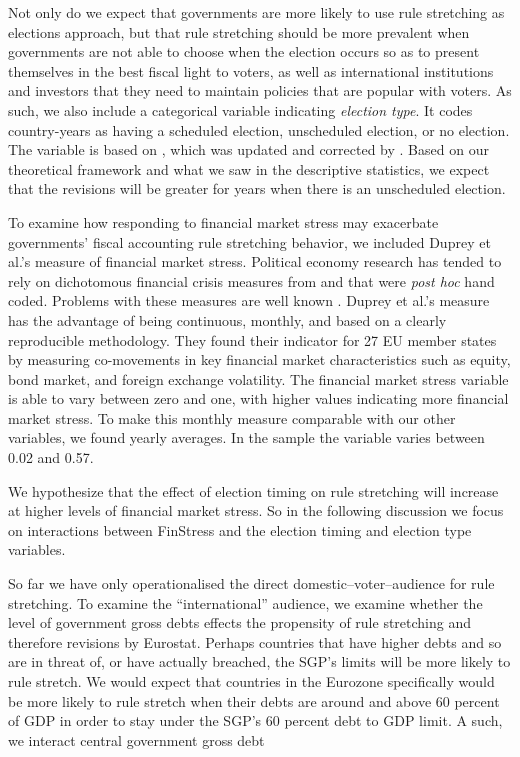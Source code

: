 \documentclass[]{article}
\begin{document}
Not only do we expect that governments are more likely to use rule stretching as elections approach, but that rule stretching should be more prevalent when governments are not able to choose when the election occurs so as to present themselves in the best fiscal light to voters, as well as international institutions and investors that they need to maintain policies that are popular with voters. As such, we also include a categorical variable indicating \emph{election type}. It codes country-years as having a scheduled election, unscheduled election, or no election. The variable is based on \cite{Brender2008}, which was updated and corrected by \cite{hallerbergWehner2015}. Based on our theoretical framework and what we saw in the descriptive statistics, we expect that the revisions will be greater for years when there is an unscheduled election.

To examine how responding to financial market stress may exacerbate governments' fiscal accounting rule stretching behavior, we included Duprey et al.'s \citeyearpar{ThibautDuprey2015} measure of financial market stress. Political economy research has tended to rely on dichotomous financial crisis measures from \cite{Laeven2012} and \cite{ReinhartRog2010} that were \emph{post hoc} hand coded. Problems with these measures are well known \citep[see][]{finstress_paper}. Duprey et al.'s measure has the advantage of being continuous, monthly, and based on a clearly reproducible methodology. They found their indicator for 27 EU member states by measuring co-movements in key financial market characteristics such as equity, bond market, and foreign exchange volatility. The financial market stress variable is able to vary between zero and one, with higher values indicating more financial market stress. To make this monthly measure comparable with our other variables, we found yearly averages. In the sample the variable varies between 0.02 and 0.57.

We hypothesize that the effect of election timing on rule stretching will increase at higher levels of financial market stress. So in the following discussion we focus on interactions between FinStress and the election timing and election type variables.

So far we have only operationalised the direct domestic--voter--audience for rule stretching. To examine the ``international'' audience, we examine whether the level of government gross debts effects the propensity of rule stretching and therefore revisions by Eurostat. Perhaps countries that have higher debts and so are in threat of, or have actually breached, the SGP's limits will be more likely to rule stretch. We would expect that countries in the Eurozone specifically would be more likely to rule stretch when their debts are around and above 60 percent of GDP in order to stay under the SGP's 60 percent debt to GDP limit. A such, we interact central government gross debt
\end{document}

